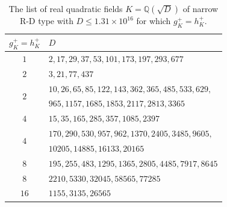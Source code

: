 \documentclass[12pt]{amsart}
\theoremstyle{definition}
\numberwithin{equation}{section}
\DeclareMathOperator{\Po}{Po}
\begin{document}
\begin{table}[!h]
	\begin{center}
		\begin{tabular}{| c|p{8.2cm}|} 
			\hline
			 $g^+_K=h^+_K$ & $D$   \\ [0.5ex] 
			\hline \hline
			 $1$ & $2,17, 29, 37, 53, 101, 173, 197, 293, 677$ \\
			\hline
		$2$ & $3, 21, 77, 437$ \\   \hline
			\multirow{2}{0.5em}{$2$} & $10, 26, 65, 85, 122, 143, 362, 365, 485, 533, 629, $ \\ 
			 & $965, 1157, 1685, 1853, 2117, 2813, 3365$ \\ \hline
			 	$4$ & $15,35,165, 285,357, 1085, 2397$ \\  \hline
			
		\multirow{2}{0.5em}{$4$} & $170,290, 530, 957, 962, 1370, 2405, 3485, 9605,$ \\ 
			 & $ 10205, 14885, 16133, 20165$ \\ \hline
			 $8$ & $195,255, 483, 1295, 1365, 2805, 4485, 7917, 8645$ \\ \hline
			$8$ & $2210, 5330, 32045, 58565, 77285$ \\  \hline 
		 $16$ & $1155, 3135, 26565$ \\ \hline
		\end{tabular} \caption{The list of real quadratic fields $K=\mathbb{Q}(\sqrt{D})$ of narrow R-D type with $D \leq 1.31 \times 10 ^{16}$ for which $g^+_{K}=h^+_{K}$. 
		} \label{tab, Kazuhiro}
	\end{center}
\end{table}
\end{document}

